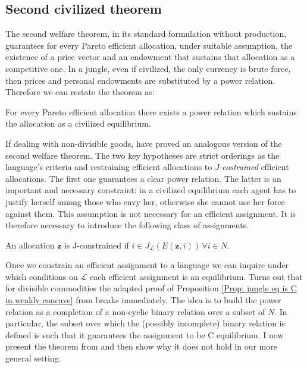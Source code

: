 \subsection{Second civilized theorem}

The second welfare theorem, in its standard formulation without production, guarantees for every Pareto efficient allocation, under suitable assumption, the existence of a price vector and an endowment that sustains that allocation as a competitive one. In a jungle, even if civilized, the only currency is brute force, then prices and personal endowments are substituted by a power relation. Therefore we can restate the theorem as:

\begin{center}
    For every Pareto efficient allocation there exists a power relation which sustains the allocation as a civilized equilibrium. 
\end{center}

If dealing with non-divisible goods, \cite[RY]{RY} have proved an analogous version of the second welfare theorem. The two key hypotheses are strict orderings as the language's criteria and restraining efficient allocations to \textit{J-costrained} efficient allocations. The first one guarantees a clear power relation. The latter is an important and necessary constraint: in a civilized equilibrium each agent has to justify herself among those who envy her, otherwise she cannot use her force against them. This assumption is not necessary for an efficient assignment. It is therefore necessary to introduce the following class of assignments.

\begin{definition}
    An allocation $\textbf{z}$ is J-constrained if $i\in J_{\mathcal{L}}(E(\textbf{z},i))\,\forall i \in N$.
\end{definition}

Once we constrain an efficient assignment to a language we can inquire under which conditions on $\mathcal{L}$ each efficient assignment is an equilibrium. Turns out that for divisible commodities the adapted proof of Proposition \ref{Prop: jungle eq is C in weakly concave} from \cite[RY]{RY} breaks immediately. The idea is to build the power relation as a completion of a non-cyclic binary relation over a subset of $N$. In particular, the subset over which the (possibly incomplete) binary relation is defined is such that it guarantees the assignment to be C equilibrium. I now present the theorem from \cite[RY]{RY} and then show why it does not hold in our more general setting.

